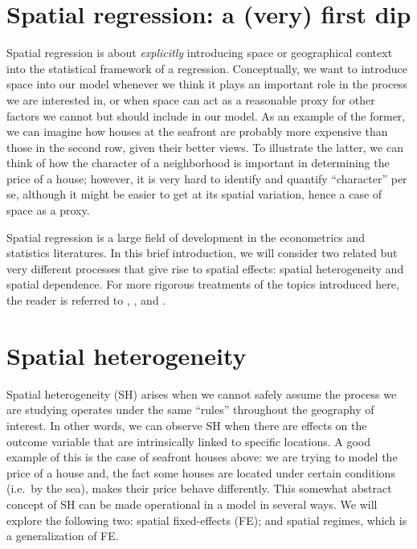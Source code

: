 \documentclass[
]{book}
\begin{document}
\hypertarget{spatial-regression-a-very-first-dip}{%
\section{Spatial regression: a (very) first dip}\label{spatial-regression-a-very-first-dip}}

Spatial regression is about \emph{explicitly} introducing space or geographical context into the statistical framework of a regression. Conceptually, we want to introduce space into our model whenever we think it plays an important role in the process we are interested in, or when space can act as a reasonable proxy for other factors we cannot but should include in our model. As an example of the former, we can imagine how houses at the seafront are probably more expensive than those in the second row, given their better views. To illustrate the latter, we can think of how the character of a neighborhood is important in determining the price of a house; however, it is very hard to identify and quantify ``character'' per se, although it might be easier to get at its spatial variation, hence a case of space as a proxy.

Spatial regression is a large field of development in the econometrics and statistics literatures. In this brief introduction, we will consider two related but very different processes that give rise to spatial effects: spatial heterogeneity and spatial dependence. For more rigorous treatments of the topics introduced here, the reader is referred to \citet{anselin2003spatial}, \citet{anselin2014modern}, and \citet{gibbons2014spatial}.

\hypertarget{spatial-heterogeneity-1}{%
\section{Spatial heterogeneity}\label{spatial-heterogeneity-1}}

Spatial heterogeneity (SH) arises when we cannot safely assume the process we are studying operates under the same ``rules'' throughout the geography of interest. In other words, we can observe SH when there are effects on the outcome variable that are intrinsically linked to specific locations. A good example of this is the case of seafront houses above: we are trying to model the price of a house and, the fact some houses are located under certain conditions (i.e.~by the sea), makes their price behave differently. This somewhat abstract concept of SH can be made operational in a model in several ways. We will explore the following two: spatial fixed-effects (FE); and spatial regimes, which is a generalization of FE.
\end{document}
